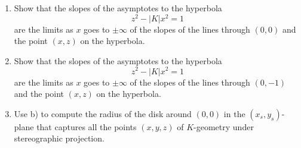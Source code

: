 \documentclass{ximera}
\begin{document}
\begin{problem}\hfil
\begin{enumerate}
\item Show that the slopes of the asymptotes to the hyperbola 
\[
z^{2}-\left\vert K\right\vert x^{2}=1 
\]
are the limits as $x$ goes to $\pm\infty$ of the slopes of the lines
through $\left( 0,0\right) $ and the point $\left( x,z\right) $ on the
hyperbola.

\item Show that the slopes of the asymptotes to the hyperbola
\[
z^{2}-\left\vert K\right\vert x^{2}=1 
\]
are the limits as $x$ goes to $\pm\infty$ of the slopes of the lines
through $\left( 0,-1\right) $ and the point $\left( x,z\right) $ on
the hyperbola.

\item Use b) to compute the radius of the disk around $\left(
  0,0\right) $ in the $\left( x_{s},y_{s}\right) $-plane that captures
  all the points $\left( x,y,z\right) $ of $K$-geometry under
  stereographic projection.
\end{enumerate}
\end{problem}
\end{document}
